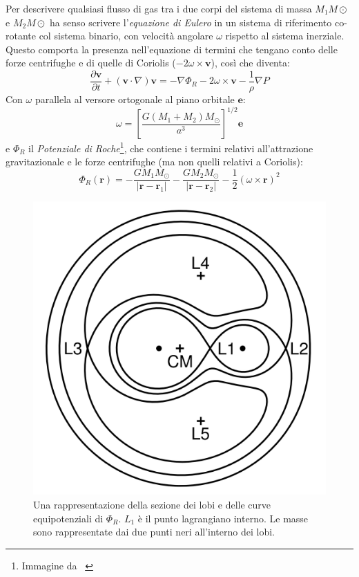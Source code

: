 \documentclass[a4paperbi]{article}
\begin{document}
	Per descrivere qualsiasi flusso di gas tra i due corpi del sistema di massa $M_1M\odot$ e $M_2M\odot$ ha senso scrivere l'\textit{equazione di Eulero} in un sistema di riferimento co-rotante col sistema binario, con velocità angolare $\omega$ rispetto al sistema inerziale. Questo comporta la presenza nell'equazione di termini che tengano conto delle forze centrifughe e di quelle di Coriolis ($-2\omega\times\textbf{v}$), così che diventa:
	\begin{equation}
		\frac{\partial \textbf{v}}{\partial t}+(\textbf{v}\cdot\nabla)\textbf{v}=-\nabla\Phi_R-2\omega\times\textbf{v}-\frac{1}{\rho}\nabla P
	\end{equation}
	Con $\omega$ parallela al versore ortogonale al piano orbitale $\textbf{e}$:
	\begin{equation}
		\omega=\left[\frac{G(M_1+M_2)M_\odot}{a^3}\right]^{1/2}\textbf{e}
	\end{equation}
	e $\Phi_R$ il \textit{Potenziale di Roche}\footnote{Immagine da ~\cite{FrankKingRaineAccretionPower}}, che contiene i termini relativi all'attrazione gravitazionale e le forze centrifughe (ma non quelli relativi a Coriolis):
	\begin{equation}
		\Phi_R(\textbf{r})=-\frac{GM_1M_\odot}{\vert\textbf{r}-\textbf{r}_1\vert}-\frac{GM_2M_\odot}{\vert\textbf{r}-\textbf{r}_2\vert}-\frac{1}{2}(\omega\times\textbf{r})^2
	\end{equation}
	
	\begin{figure}[H]
		\centering
		\includegraphics[width=0.6\linewidth]{RocheEquipotential}
		\caption{Una rappresentazione della sezione dei lobi e delle curve equipotenziali di $\Phi_R$. $L_1$ è il punto lagrangiano interno. Le masse sono rappresentate dai due punti neri all'interno dei lobi.}
		\label{fig:rocheequipotential}
	\end{figure}
	
\end{document}
